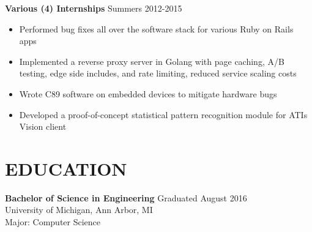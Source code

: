 \documentclass[line,margin]{res}
\begin{document}
\begin{resume}
                

                {\sc \textbf{Various (4) Internships}} \hfill Summers 2012-2015
                 \begin{itemize}  \itemsep -2pt %
                 \item Performed bug fixes all over the software stack for various Ruby on Rails apps

                 \item Implemented a reverse proxy server in Golang with page caching, A/B testing, edge side includes, and rate limiting, reduced service scaling costs

                 \item Wrote C89 software on embedded devices to mitigate hardware bugs

                 \item Developed a proof-of-concept statistical pattern recognition module for ATI\textquotesingle s Vision client
                 \end{itemize}


\section{\textcolor{HeaderColor}{EDUCATION}} {\sc \textbf{Bachelor of Science in Engineering}} \hfill Graduated August 2016\\
                 University of Michigan, Ann Arbor, MI \\
                 Major: Computer Science

\end{resume}
\end{document}
